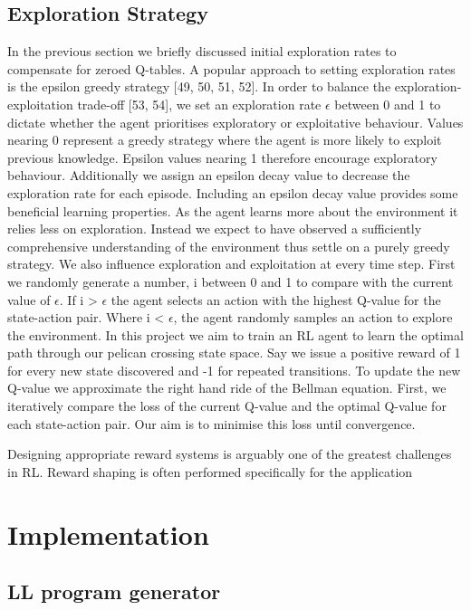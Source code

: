 \documentclass[runningheads]{llncs}
\begin{document}
\subsection{Exploration Strategy}
In the previous section we briefly discussed initial exploration rates to compensate for
zeroed Q-tables. A popular approach to setting exploration rates is the epsilon greedy
strategy [49, 50, 51, 52]. In order to balance the exploration-exploitation trade-off [53, 54],
we set an exploration rate $\epsilon$ between 0 and 1 to dictate whether the agent prioritises
exploratory or exploitative behaviour. Values nearing 0 represent a greedy strategy where
the agent is more likely to exploit previous knowledge. Epsilon values nearing 1 therefore
encourage exploratory behaviour. Additionally we assign an epsilon decay value to
decrease the exploration rate for each episode. Including an epsilon decay value provides
some beneficial learning properties. As the agent learns more about the environment it
relies less on exploration. Instead we expect to have observed a sufficiently comprehensive
understanding of the environment thus settle on a purely greedy strategy. We also
influence exploration and exploitation at every time step. First we randomly generate
a number, i between 0 and 1 to compare with the current value of $\epsilon$. If i > $\epsilon$ the agent
selects an action with the highest Q-value for the state-action pair. Where i < $\epsilon$, the agent
randomly samples an action to explore the environment.
In this project we aim to train an RL agent to learn the optimal path through our
pelican crossing state space. Say we issue a positive reward of 1 for every new state
discovered and -1 for repeated transitions. To update the new Q-value we approximate
the right hand ride of the Bellman equation. First, we iteratively compare the loss of
the current Q-value and the optimal Q-value for each state-action pair. Our aim is to
minimise this loss until convergence.


Designing appropriate reward systems is arguably one of the greatest challenges in RL. Reward shaping is often performed specifically for the application



\section{Implementation}
\subsection{LL program generator}
\end{document}
